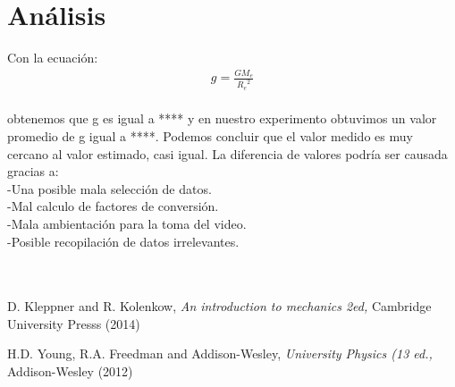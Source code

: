 \documentclass[12pt]{article}
\begin{document}
\section{Análisis}

Con la ecuación:\\
\begin{equation}
	\begin{aligned}
		{g}=\frac{G{M}_{e}}{{{R}_{e}}^{2}}
		\label{eq3}
	\end{aligned}
\end{equation}\\

obtenemos que g es igual a **** y en nuestro experimento obtuvimos un valor promedio de g igual a ****. Podemos concluir que el valor medido es muy cercano al valor estimado, casi igual. La diferencia de valores podría ser causada gracias a:\\
-Una posible mala selección de datos.\\
-Mal calculo de factores de conversión.\\
-Mala ambientación para la toma del video.\\
-Posible recopilación de datos irrelevantes.\\

\\
\\

\begin{thebibliography}{}

  D. Kleppner and R. Kolenkow, {\it An introduction to mechanics 2ed,} Cambridge University Presss (2014)

  H.D. Young, R.A. Freedman and Addison-Wesley, {\it University Physics (13 ed.,} Addison-Wesley  (2012)
    
\end{thebibliography}
\end{document}
